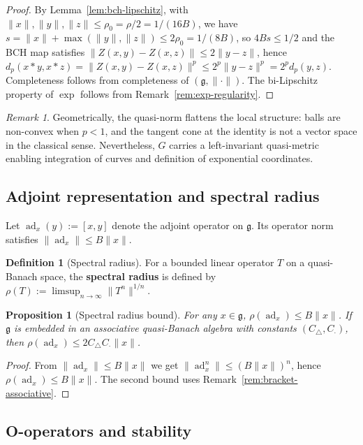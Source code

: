 \documentclass[10pt]{amsart}
\newtheorem{proposition}[theorem]{Proposition}
\theoremstyle{definition}
\newtheorem{definition}[theorem]{Definition}
\theoremstyle{remark}
\newtheorem{remark}[theorem]{Remark}
\numberwithin{equation}{section}
\DeclareMathOperator{\ad}{ad}
\newcommand{\Ctri}{C_{\triangle}}    %
\newcommand{\Cmult}{C_{\cdot}}       %
\newcommand{\Cbracket}{B}            %
\newcommand{\dpmet}[2]{d_p(#1,#2)}   %
\begin{document}
\begin{proof}
By Lemma~\ref{lem:bch-lipschitz}, with $\|x\|,\|y\|,\|z\| \le \rho_0 = \rho/2 = 1/(16\Cbracket)$,
we have $s = \|x\| + \max(\|y\|,\|z\|) \le 2\rho_0 = 1/(8\Cbracket)$, so
$4\Cbracket s \le 1/2$ and the BCH map satisfies
$\|Z(x,y) - Z(x,z)\| \le 2\|y-z\|$, hence
$\dpmet{x*y}{x*z} = \|Z(x,y)-Z(x,z)\|^p \le 2^p \|y-z\|^p = 2^p \dpmet{y}{z}$.
Completeness follows from completeness of $(\mathfrak{g},\|\cdot\|)$.  The bi-Lipschitz
property of $\exp$ follows from Remark~\ref{rem:exp-regularity}.
\end{proof}

\begin{remark}
Geometrically, the quasi-norm flattens the local structure: balls are non-convex when
$p<1$, and the tangent cone at the identity is not a vector space in the classical sense.
Nevertheless, $G$ carries a left-invariant quasi-metric enabling integration of curves
and definition of exponential coordinates.
\end{remark}

\subsection{Adjoint representation and spectral radius}

Let $\ad_x(y) := [x,y]$ denote the adjoint operator on $\mathfrak{g}$.  Its operator norm
satisfies $\|\ad_x\| \le \Cbracket\|x\|$.

\begin{definition}[Spectral radius]
For a bounded linear operator $T$ on a quasi-Banach space, the \textbf{spectral radius}
is defined by $\rho(T) := \limsup_{n\to\infty} \|T^n\|^{1/n}$.
\end{definition}

\begin{proposition}[Spectral radius bound]\label{prop:spectral}
For any $x\in\mathfrak{g}$, $\rho(\ad_x) \le \Cbracket\|x\|$.  If $\mathfrak{g}$ is
embedded in an associative quasi-Banach algebra with constants $(\Ctri,\Cmult)$, then
$\rho(\ad_x) \le 2\Ctri\Cmult\|x\|$.
\end{proposition}

\begin{proof}
From $\|\ad_x\| \le \Cbracket\|x\|$ we get $\|\ad_x^n\| \le (\Cbracket\|x\|)^n$, hence
$\rho(\ad_x) \le \Cbracket\|x\|$.  The second bound uses
Remark~\ref{rem:bracket-associative}.
\end{proof}

\subsection{O-operators and stability}
\end{document}
